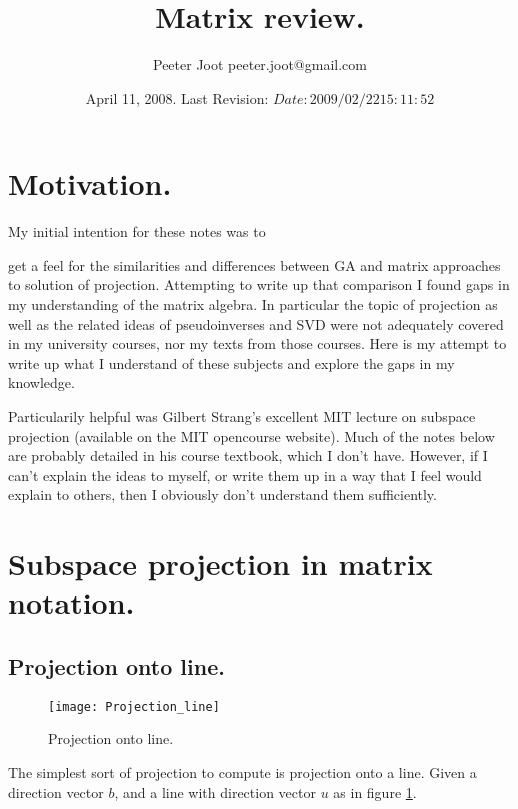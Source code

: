 \documentclass{article}      %
\title{ Matrix review. } %
\author{Peeter Joot \quad peeter.joot@gmail.com}         %
\date{ April 11, 2008.  Last Revision: $Date: 2009/02/22 15:11:52 $ }
\begin{document}

\maketitle{}


\section{ Motivation. }


My initial intention for these notes was to 

get a feel for the similarities and differences between GA and matrix approaches to solution of projection.  Attempting to
write up that comparison
I found gaps in my understanding of the matrix algebra.  In particular the topic of projection as well as the related
ideas of pseudoinverses and SVD were not adequately covered in my university courses, nor my texts from those courses.
Here is my attempt to write up what I understand of these subjects and explore the gaps in my knowledge.

Particularily helpful was 
Gilbert Strang's excellent MIT lecture on subspace projection (available on the MIT opencourse website).
Much of the notes below are probably detailed in his course textbook, which I don't have.  However, 
if I can't explain the ideas to myself, or write them up in a way that I feel would explain
to others, then I obviously don't understand them sufficiently.


\section{ Subspace projection in matrix notation. }


\subsection{ Projection onto line. }


\begin{figure}[htp]

\centering
\texttt{[image: Projection\_line]}
\caption{Projection onto line.}\label{fig:Projection_line}
\end{figure}

The simplest sort of projection to compute is projection onto a line.  Given a direction vector $b$, and a line with direction vector $u$
as in figure \ref{fig:Projection_line}.
\end{document}
